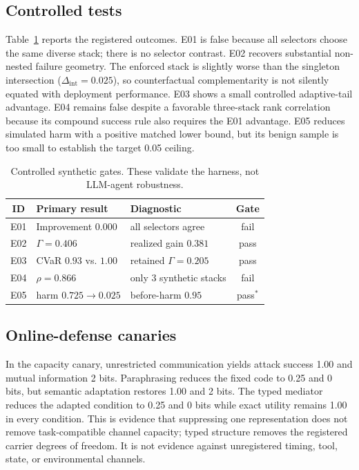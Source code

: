 \documentclass[10pt]{article}
\begin{document}
\subsection{Controlled tests}
Table~\ref{tab:controlled} reports the registered outcomes. E01 is false because all selectors choose the same diverse stack; there is no selector contrast. E02 recovers substantial non-nested failure geometry. The enforced stack is slightly worse than the singleton intersection ($\Delta_{\mathrm{int}}=0.025$), so counterfactual complementarity is not silently equated with deployment performance. E03 shows a small controlled adaptive-tail advantage. E04 remains false despite a favorable three-stack rank correlation because its compound success rule also requires the E01 advantage. E05 reduces simulated harm with a positive matched lower bound, but its benign sample is too small to establish the target 0.05 ceiling.

\begin{table}[h]
\centering
\small
\caption{Controlled synthetic gates. These validate the harness, not LLM-agent robustness.}
\label{tab:controlled}
\begin{tabular}{cllc}
\toprule
ID & Primary result & Diagnostic & Gate \\
\midrule
E01 & Improvement $0.000$ & all selectors agree & fail \\
E02 & $\Gamma=0.406$ & realized gain $0.381$ & pass \\
E03 & CVaR $0.93$ vs. $1.00$ & retained $\Gamma=0.205$ & pass \\
E04 & $\rho=0.866$ & only 3 synthetic stacks & fail \\
E05 & harm $0.725\rightarrow0.025$ & before-harm $0.95$ & pass$^*$ \\
\bottomrule
\end{tabular}
\end{table}

\subsection{Online-defense canaries}
In the capacity canary, unrestricted communication yields attack success 1.00 and mutual information 2 bits. Paraphrasing reduces the fixed code to 0.25 and 0 bits, but semantic adaptation restores 1.00 and 2 bits. The typed mediator reduces the adapted condition to 0.25 and 0 bits while exact utility remains 1.00 in every condition. This is evidence that suppressing one representation does not remove task-compatible channel capacity; typed structure removes the registered carrier degrees of freedom. It is not evidence against unregistered timing, tool, state, or environmental channels.
\end{document}
